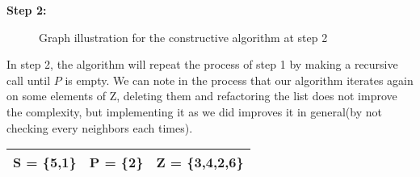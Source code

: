     \vspace{1\baselineskip}

    \begin{minipage}{\linewidth}
        \textbf{Step 2:} \newline
        \begin{minipage}{0.4\textwidth}
            \begin{figure}[H]
                \centering
                \caption{Graph illustration for the constructive algorithm at step 2}
                \label{fig:constructive-mewc-edge-step2}
            \end{figure}
        \end{minipage}
        \begin{minipage}{0.6\textwidth}
            In step 2, the algorithm will repeat the process of step 1 by making a recursive call until $P$ is empty. We can note in the process that our algorithm iterates again on some elements of Z, deleting them and refactoring the list does not improve the complexity, but implementing it as we did improves it in general(by not checking every neighbors each times). 
    
            \begin{center}
                \begin{tabular}{|lll|}
                    \hline
                    S = \{5,1\} & P = \{2\} & Z = \{3,4,2,6\} \\
                    \hline
                \end{tabular}
            \end{center}
        \end{minipage}
    \end{minipage}

